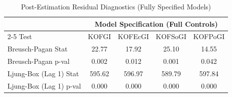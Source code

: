 \begin{table}
\caption{Post-Estimation Residual Diagnostics (Fully Specified Models)}
\label{tab:model_diagnostics}
\begin{tabular}{lcccc}
\toprule
& \multicolumn{4}{c}{Model Specification (Full Controls)} \\
\cmidrule(lr){2-5}
Test & KOFGI & KOFEcGI & KOFSoGI & KOFPoGI \\
\midrule
Breusch-Pagan Stat & 22.77 & 17.92 & 25.10 & 14.55 \\
Breusch-Pagan p-val & 0.002 & 0.012 & 0.001 & 0.042 \\
Ljung-Box (Lag 1) Stat & 595.62 & 596.97 & 589.79 & 597.84 \\
Ljung-Box (Lag 1) p-val & 0.000 & 0.000 & 0.000 & 0.000 \\
\bottomrule
\end{tabular}
\end{table}
